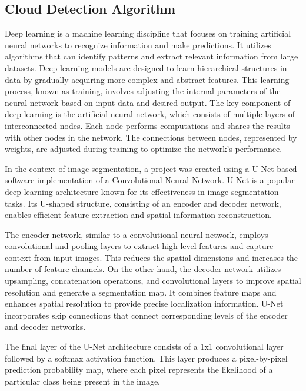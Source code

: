 \documentclass[conference]{IEEEtran}
\begin{document}
\subsection{Cloud Detection Algorithm}
Deep learning is a machine learning discipline that focuses on training artificial neural networks to recognize information and make predictions. It utilizes algorithms that can identify patterns and extract relevant information from large datasets. Deep learning models are designed to learn hierarchical structures in data by gradually acquiring more complex and abstract features. This learning process, known as training, involves adjusting the internal parameters of the neural network based on input data and desired output. The key component of deep learning is the artificial neural network, which consists of multiple layers of interconnected nodes. Each node performs computations and shares the results with other nodes in the network. The connections between nodes, represented by weights, are adjusted during training to optimize the network's performance.

In the context of image segmentation, a project was created using a U-Net-based software implementation of a Convolutional Neural Network. U-Net is a popular deep learning architecture known for its effectiveness in image segmentation tasks. Its U-shaped structure, consisting of an encoder and decoder network, enables efficient feature extraction and spatial information reconstruction.

The encoder network, similar to a convolutional neural network, employs convolutional and pooling layers to extract high-level features and capture context from input images. This reduces the spatial dimensions and increases the number of feature channels. On the other hand, the decoder network utilizes upsampling, concatenation operations, and convolutional layers to improve spatial resolution and generate a segmentation map. It combines feature maps and enhances spatial resolution to provide precise localization information. U-Net incorporates skip connections that connect corresponding levels of the encoder and decoder networks.

The final layer of the U-Net architecture consists of a 1x1 convolutional layer followed by a softmax activation function. This layer produces a pixel-by-pixel prediction probability map, where each pixel represents the likelihood of a particular class being present in the image.
\end{document}
